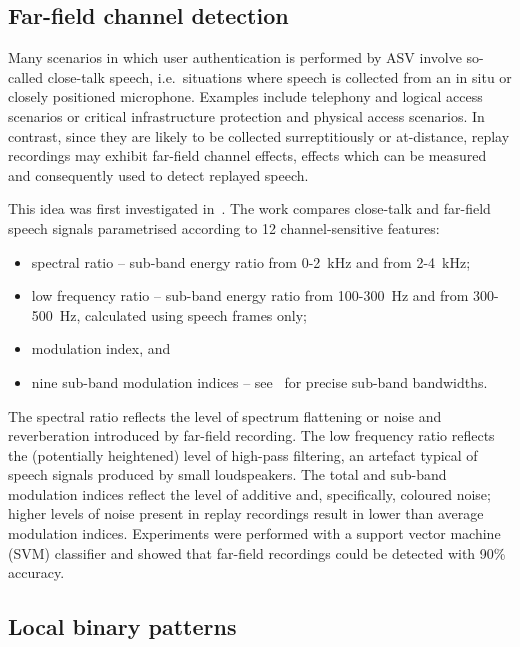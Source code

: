 \subsection{Far-field channel detection}
\label{subsec:ffd}

Many scenarios in which user authentication is performed by ASV involve so-called close-talk speech, i.e.\ situations where speech is collected from an in situ or closely positioned microphone.  Examples include telephony and logical access scenarios or critical infrastructure protection and physical access scenarios.  In contrast, since they are likely to be collected surreptitiously or at-distance, replay recordings may exhibit far-field channel effects, effects which can be measured and consequently used to detect replayed speech.  

This idea was first investigated in~\cite{Villalba2011}.  The work compares close-talk and far-field speech signals parametrised according to 12 channel-sensitive features:


\begin{itemize}
\item spectral ratio -- sub-band energy ratio from 0-2~kHz and from 2-4~kHz; 
\item low frequency ratio -- sub-band energy ratio from 100-300~Hz and from 300-500~Hz, calculated using speech frames only;
\item modulation index, and
\item nine sub-band modulation indices -- see~\cite{Villalba2011} for precise sub-band bandwidths.
\end{itemize}


The spectral ratio reflects the level of spectrum flattening or noise and reverberation introduced by far-field recording.  The low frequency ratio reflects the (potentially heightened) level of high-pass filtering, an artefact typical of speech signals produced by small loudspeakers.  The total and sub-band modulation indices reflect the level of additive and, specifically, coloured noise; higher levels of noise present in replay recordings result in lower than average modulation indices.  Experiments were performed with a support vector machine (SVM) classifier and showed that far-field recordings could be detected with 90\% accuracy.  %



\subsection{Local binary patterns}


